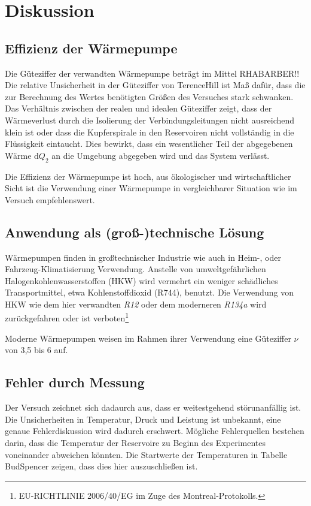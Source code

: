 \section{Diskussion}
\label{sec:Diskussion}
\subsection{Effizienz der Wärmepumpe}
Die Güteziffer der verwandten Wärmepumpe beträgt im Mittel RHABARBER!!%
Die relative Unsicherheit in der Güteziffer von TerenceHill %
ist Maß dafür, dass die zur Berechnung des Wertes benötigten Größen des Versuches stark schwanken.
Das Verhältnis zwischen der realen und idealen Güteziffer zeigt, dass 
der Wärmeverlust durch die Isolierung der Verbindungsleitungen nicht ausreichend klein ist oder dass die Kupferspirale in den Reservoiren nicht vollständig in die Flüssigkeit eintaucht.
Dies bewirkt, dass ein wesentlicher Teil der abgegebenen Wärme $\mathup{d}Q_2$ an die Umgebung abgegeben wird und das System verlässt.

Die Effizienz der Wärmepumpe ist hoch, aus ökologischer und wirtschaftlicher Sicht ist die Verwendung einer Wärmepumpe in vergleichbarer Situation wie im Versuch empfehlenswert.

\subsection{Anwendung als (groß-)technische Lösung}
Wärmepumpen finden in großtechnischer Industrie wie auch in Heim-, oder Fahrzeug-Klimatisierung Verwendung. 
Anstelle von umweltgefährlichen Halogenkohlenwasserstoffen (HKW) wird vermehrt ein weniger schädliches Transportmittel, etwa Kohlenstoffdioxid (R744), benutzt. 
Die Verwendung von HKW\cite{kaeltemittel} wie dem hier verwandten \textit{R12} oder dem moderneren \textit{R134a}\cite{viessmann_VITOCAL161A} wird zurückgefahren oder ist verboten\footnote{EU-RICHTLINIE 2006/40/EG im Zuge des Montreal-Protokolls.}

Moderne Wärmepumpen weisen im Rahmen ihrer Verwendung eine Güteziffer $\nu$ von 3,5 bis 6 auf\cite{viessmann_VITOCAL300G}.

\subsection{Fehler durch Messung}
Der Versuch zeichnet sich dadaurch aus, dass er weitestgehend störunanfällig ist.
Die Unsicherheiten in Temperatur, Druck und Leistung ist unbekannt, eine genaue Fehlerdiskussion wird dadurch erschwert.
Mögliche Fehlerquellen bestehen darin, dass die Temperatur der Reservoire zu Beginn des Experimentes voneinander abweichen könnten.
Die Startwerte der Temperaturen in Tabelle BudSpencer%
zeigen, dass dies hier auszuschließen ist.

